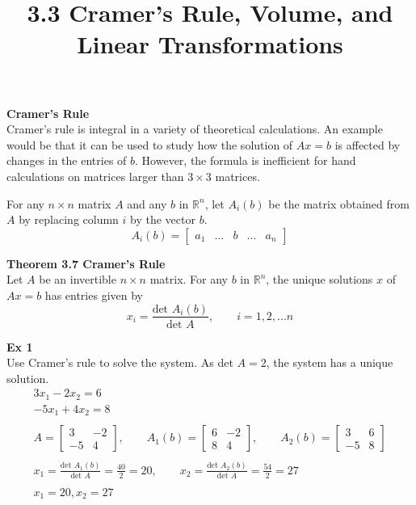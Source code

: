 \documentclass{article}
\title{3.3 Cramer's Rule, Volume, and Linear Transformations}
\begin{document}
  \maketitle
  \textbf{Cramer's Rule}\\
  Cramer's rule is integral in a variety of theoretical calculations. An example would be that it can be used to study how the solution of $ Ax=b $ is affected by changes in the entries of $ b $. However, the formula is inefficient for hand calculations on matrices larger than $ 3 \times 3 $ matrices.

  For any $ n \times n $ matrix $ A $ and any $ b $ in $ \mathbb{R}^{n} $, let $ A_i(b) $ be the matrix obtained from $ A $ by replacing column $ i $ by the vector $ b $.
  \[
    A_i(b)=\begin{bmatrix}
      a_1 &... &b &... &a_n
    \end{bmatrix}
  \]

  \textbf{Theorem 3.7 Cramer's Rule}\\
  Let $ A $ be an invertible $ n \times n $ matrix. For any $ b $ in $ \mathbb{R}^{n} $, the unique solutions $ x $ of $ Ax=b $ has entries given by
  \[
    x_i=\frac{\text{det } A_i(b)}{\text{det }A}, \qquad i=1,2,...n
  \]
  
  \textbf{Ex 1}\\
   Use Cramer's rule to solve the system. As det $ A=2 $, the system has a unique solution.
   \[
     \begin{gathered}
     3x_1-2x_2=6\\
     -5x_1+4x_2=8\\
     ~\\
     A = \begin{bmatrix}
       3 &-2\\
       -5 &4
     \end{bmatrix}, \qquad
     A_1(b)=\begin{bmatrix}
       6 &-2\\
       8 &4
     \end{bmatrix}, \qquad
     A_2(b)=\begin{bmatrix}
       3 &6\\
       -5 &8
     \end{bmatrix}\\
     ~\\
     x_1=\frac{\text{det }A_1(b) }{\text{det }A}=\frac{40}{2}=20, \qquad
     x_2=\frac{\text{det }A_2(b) }{\text{det }A}=\frac{54}{2}=27\\\
     ~\\
     \boxed{x_1=20,x_2=27}
     \end{gathered}
   \]
\end{document}
